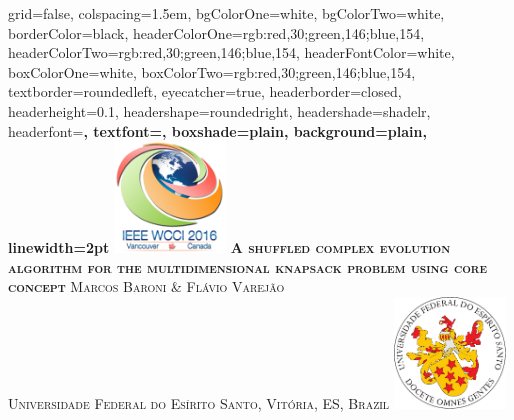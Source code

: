 \documentclass[landscape,final,a0paper,fontscale=0.38]{baposter}
\begin{document}
\begin{poster}%
  {
  grid=false,
  colspacing=1.5em,
  bgColorOne=white,
  bgColorTwo=white,
  borderColor=black,
  headerColorOne={rgb:red,30;green,146;blue,154},
  headerColorTwo={rgb:red,30;green,146;blue,154},
  headerFontColor=white,
  boxColorOne=white,
  boxColorTwo={rgb:red,30;green,146;blue,154},
  textborder=roundedleft,
  eyecatcher=true,
  headerborder=closed,
  headerheight=0.1\textheight,
  headershape=roundedright,
  headershade=shadelr,
  headerfont=\Large\bf\textsc, %
  textfont={\setlength{\parindent}{1.5em}},
  boxshade=plain,
  background=plain,
  linewidth=2pt
  }
  {\includegraphics[height=8em]{imgs/wcci-logo}} 
  {\bf\textsc{\LARGE \fontsize{20pt}{0.5cm}\selectfont A shuffled complex evolution algorithm for
the multidimensional knapsack problem using core concept}\vspace{0.3em}}
{\textsc{Marcos Baroni \& Flávio Varejão \\ \vspace{0.1em} {\large Universidade Federal do Es\'irito Santo, Vit\'oria, ES, Brazil} }}
  {%
    \includegraphics[height=8.0em]{../../brasao-ufes}
  }

    \newcommand{\colouredcircle}{%
      \tikz{\useasboundingbox (-0.2em,-0.32em) rectangle(0.2em,0.32em); \draw[draw=black,fill=lightblue,line width=0.03em] (0,0) circle(0.18em);}}


\end{poster}
\end{document}
